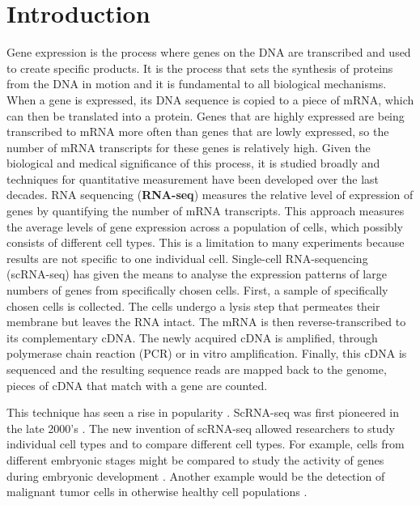 \chapter{Introduction}
Gene expression is the process where genes on the DNA are transcribed and used to create specific products. It is the process that sets the synthesis of proteins from the DNA in motion and it is fundamental to all biological mechanisms. When a gene is expressed, its DNA sequence is copied to a piece of mRNA, which can then be translated into a protein. Genes that are highly expressed are being transcribed to mRNA more often than genes that are lowly expressed, so the number of mRNA transcripts for these genes is relatively high. Given the biological and medical significance of this process, it is studied broadly and techniques for quantitative measurement have been developed over the last decades.
RNA sequencing (\textbf{RNA-seq}) measures the relative level of expression of genes by quantifying the number of mRNA transcripts. This approach measures the average levels of gene expression across a population of cells, which possibly consists of different cell types. This is a limitation to many experiments because results are not specific to one individual cell.
Single-cell RNA-sequencing (scRNA-seq) \cite{haque2017practical} has given the means to analyse the expression patterns of large numbers of genes from specifically chosen cells. 
First, a sample of specifically chosen cells is collected. The cells undergo a lysis step that permeates their membrane but leaves the RNA intact. The mRNA is then reverse-transcribed to its complementary cDNA. The newly acquired cDNA is amplified, through polymerase chain reaction (PCR) or in vitro amplification. Finally, this cDNA is sequenced and the resulting sequence reads are mapped back to the genome, pieces of cDNA that match with a gene are counted.

This technique has seen a rise in popularity \cite{shapiro2013single}. ScRNA-seq was first pioneered in the late 2000's \cite{tang2009mrna}. %
The new invention of scRNA-seq allowed researchers to study individual cell types and to compare different cell types. For example, cells from different embryonic stages might be compared to study the activity of genes during embryonic development \cite{deng2014single}. Another example would be the detection of malignant tumor cells in otherwise healthy cell populations \cite{tirosh2016dissecting}.


